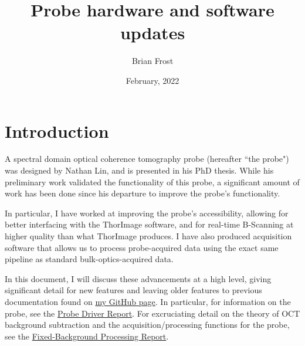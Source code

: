 \documentclass{article}
\title{Probe hardware and software updates}
\date{February, 2022}
\author{Brian Frost}
\begin{document}
\maketitle

\section{Introduction}

\par{A spectral domain optical coherence tomography probe (hereafter ``the probe") was designed by Nathan Lin, and is presented in his PhD thesis. While his preliminary work validated the functionality of this probe, a significant amount of work has been done since his departure to improve the probe's functionality.}
\par{In particular, I have worked at improving the probe's accessibility, allowing for better interfacing with the ThorImage software, and for real-time B-Scanning at higher quality than what ThorImage produces. I have also produced acquisition software that allows us to process probe-acquired data using the exact same pipeline as standard bulk-optics-acquired data.}
\par{In this document, I will discuss these advancements at a high level, giving significant detail for new features and leaving older features to previous documentation found on \href{https://github.com/Brian-Frost-LaPlante/LabReports}{my GitHub page}. In particular, for information on the probe, see the \href{https://github.com/Brian-Frost-LaPlante/LabReports/blob/main/ProbeReports/ProbeDriverReport.pdf}{Probe Driver Report}. For excruciating detail on the theory of OCT background subtraction and the acquisition/processing functions for the probe, see the \href{https://github.com/Brian-Frost-LaPlante/LabReports/blob/main/ProbeReports/Fixed-BackgroundProcessing.pdf}{Fixed-Background Processing Report}.}
\end{document}
